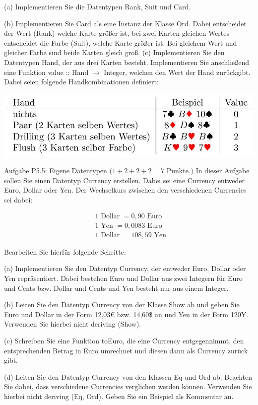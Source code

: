 \documentclass[10pt]{article}
\begin{document}
(a) Implementieren Sie die Datentypen Rank, Suit und Card.

(b) Implementieren Sie Card als eine Instanz der Klasse Ord. Dabei entscheidet der Wert (Rank) welche Karte größer ist, bei zwei Karten gleichen Wertes entscheidet die Farbe (Suit), welche Karte größer ist. Bei gleichem Wert und gleicher Farbe sind beide Karten gleich groß. (c) Implementieren Sie den Datentypen Hand, der aus drei Karten besteht. Implementieren Sie anschließend eine Funktion value :: Hand $\rightarrow$ Integer, welchen den Wert der Hand zurückgibt. Dabei seien folgende Handkombinationen definiert:

\includegraphics[max width=\textwidth]{2022_11_15_0a5a2eee0aef383b0ce9g-3}

Aufgabe P5.5: Eigene Datentypen $(1+2+2+2=7$ Punkte $)$ In dieser Aufgabe sollen Sie einen Datentyp Currency erstellen. Dabei sei eine Currency entweder Euro, Dollar oder Yen. Der Wechselkurs zwischen den verschiedenen Currencies sei dabei:

$$
\begin{aligned}
&1 \text { Dollar }=0,90 \text { Euro } \\
&1 \text { Yen }=0,0083 \text { Euro } \\
&1 \text { Dollar }=108,59 \text { Yen }
\end{aligned}
$$

Bearbeiten Sie hierfür folgende Schritte:

(a) Implementieren Sie den Datentyp Currency, der entweder Euro, Dollar oder Yen repräsentiert. Dabei bestehen Euro und Dollar aus zwei Integern für Euro und Cents bzw. Dollar und Cents und Yen besteht nur aus einem Integer.

(b) Leiten Sie den Datentyp Currency von der Klasse Show ab und geben Sie Euro und Dollar in der Form 12,03€ bzw. 14,60\$ an und Yen in der Form 120¥. Verwenden Sie hierbei nicht deriving (Show).

(c) Schreiben Sie eine Funktion toEuro, die eine Currency entgegennimmt, den entsprechenden Betrag in Euro umrechnet und diesen dann als Currency zurück gibt.

(d) Leiten Sie den Datentyp Currency von den Klassen Eq und Ord ab. Beachten Sie dabei, dass verschiedene Currencies verglichen werden können. Verwenden Sie hierbei nicht deriving (Eq, Ord). Geben Sie ein Beispiel als Kommentar an.
\end{document}
